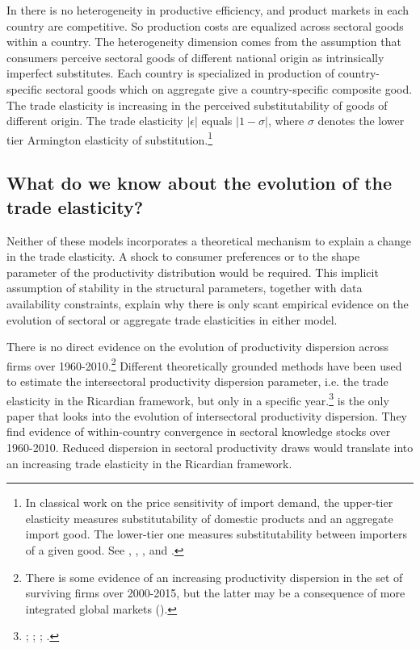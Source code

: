 \documentclass[12pt,twoside,a4paper,notitlepage]{article}
\begin{document}
In \cite{Anderson2003a} there is no heterogeneity in productive efficiency, and
product markets in each country are competitive.
So production costs are equalized across sectoral goods within a country.
The heterogeneity dimension comes from the assumption that consumers perceive sectoral goods of different national origin as intrinsically imperfect substitutes.
Each country is specialized in production of country-specific sectoral goods which on aggregate give a country-specific composite good.
The trade elasticity is increasing in the perceived substitutability of goods of different origin. 
The trade elasticity $|\epsilon|$ equals $|1-\sigma|$, where $\sigma$ denotes the lower tier Armington elasticity of substitution.\footnote{In classical work on the price sensitivity of import demand, the upper-tier elasticity measures substitutability of domestic products and an aggregate import good.
The lower-tier one measures substitutability between importers of a given good.
See \cite{Sato1967}, \cite{Reinert1991}, \cite{Saito2004}, and \cite{Feenstra2018}.} 

\subsection{What do we know about the evolution of the trade elasticity? \label{mark-1.2.}}

Neither of these models incorporates a theoretical mechanism to explain a change in the trade elasticity.
A shock to consumer preferences or to the shape parameter of the productivity distribution would be required. This implicit assumption of stability in the structural parameters, together with data availability constraints, explain why there is only scant empirical evidence on the evolution of sectoral or aggregate trade elasticities in either model. 

There is no direct evidence on the evolution of productivity dispersion across firms over 1960-2010.\footnote{There is some evidence of an increasing productivity dispersion in the set of surviving firms over 2000-2015, but the latter may be a consequence of more integrated global markets (\cite{DiGiovanni2011}).}
Different theoretically grounded methods have been used to estimate the intersectoral productivity dispersion parameter, i.e. the trade elasticity in the Ricardian framework, but only in a specific year.\footnote{\cite{Eaton2002}; \cite{Simonovska2014}; \cite{Costinot2012a}; \cite{Caliendo2015}.}  \cite{Levchenko2011} is the only paper that looks into  the evolution of intersectoral productivity dispersion. They find evidence of within-country convergence in sectoral knowledge stocks over 1960-2010.
Reduced dispersion in sectoral productivity draws would translate into an increasing trade elasticity in the Ricardian framework.
\end{document}
